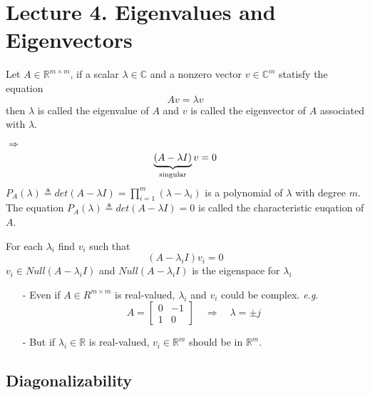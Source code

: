 \section{Lecture 4. Eigenvalues and Eigenvectors}
\begin{multicols}{2}
\begin{definition}
    Let $A\in\mathbb{R}^{m\times m}$, if a scalar $\lambda\in\mathbb{C}$ and a nonzero vector $v\in\mathbb{C}^m$ statisfy the equation 
    \[
        Av=\lambda v
    \]
    then $\lambda$ is called the eigenvalue of $A$ and $v$ is called the eigenvector of $A$ associated with $\lambda$.
\end{definition}
$\Longrightarrow$ 
\[
    \underbrace{(A-\lambda I)}_{\text{\rm singular}}v = 0
\]
$P_A(\lambda)\triangleq det(A-\lambda I)=\prod_{i=1}^m(\lambda-\lambda_i)$ is a polynomial of $\lambda$ with degree $m$.
The equation $P_A(\lambda)\triangleq det(A-\lambda I)=0$ is called the characteristic euqation of $A$.

For each $\lambda_i$ find $v_i$ such that 
\[
    (A-\lambda_i I)v_i = 0
\]
$v_i\in Null(A-\lambda_i I)$ and $Null(A-\lambda_i I)$ is the eigenspace for $\lambda_i$
\begin{enumerate}
    \item [-] Even if $A\in R^{m\times m}$ is real-valued, $\lambda_i$ and $v_i$ could be complex.
    \emph{e.g.} 
    \[
        A=\begin{bmatrix}
            0& -1 \\ 1 & 0
        \end{bmatrix}\quad \Longrightarrow \quad \lambda = \pm j
    \]
    \item [-] But if $\lambda_i\in\mathbb{R}$ is real-valued, $v_i\in\mathbb{R}^m$ should be in $\mathbb{R}^m$.
\end{enumerate}

\subsection{Diagonalizability}

\end{multicols}
